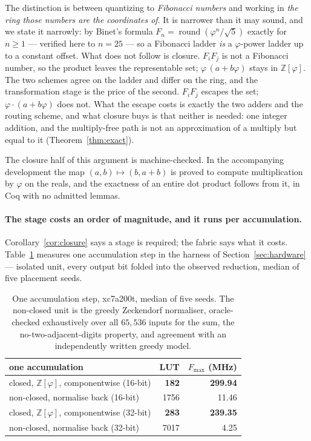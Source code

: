 The distinction is between quantizing to \emph{Fibonacci numbers} and working in
\emph{the ring those numbers are the coordinates of}. It is narrower than it may
sound, and we state it narrowly: by Binet's formula $F_n = \operatorname{round}
(\varphi^{n}/\sqrt5)$ exactly for $n \ge 1$ --- verified here to $n = 25$ --- so a
Fibonacci ladder \emph{is} a $\varphi$-power ladder up to a constant offset. What
does not follow is closure. $F_iF_j$ is not a Fibonacci number, so the product
leaves the representable set; $\varphi\,(a+b\varphi)$ stays in
$\mathbb{Z}[\varphi]$. The two schemes agree on the ladder and differ on the
ring, and the transformation stage is the price of the second. $F_iF_j$ escapes the set;
$\varphi\cdot(a+b\varphi)$ does not. What the escape costs is exactly the two
adders and the routing scheme, and what closure buys is that neither is needed:
one integer addition, and the multiply-free path is not an approximation of a
multiply but equal to it (Theorem~\ref{thm:exact}).

The closure half of this argument is machine-checked. In the accompanying
development the map $(a,b)\mapsto(b,a+b)$ is proved to compute multiplication by
$\varphi$ on the reals, and the exactness of an entire dot product follows from
it, in Coq with no admitted lemmas.

\paragraph{The stage costs an order of magnitude, and it runs per accumulation.}
Corollary~\ref{cor:closure} says a stage is required; the fabric says what it
costs. Table~\ref{tab:closure} measures one accumulation step in the harness of
Section~\ref{sec:hardware} --- isolated unit, every output bit folded into the
observed reduction, median of five placement seeds.

\begin{table}[t]\centering
\caption{One accumulation step, xc7a200t, median of five seeds. The non-closed
unit is the greedy Zeckendorf normaliser, oracle-checked exhaustively over all
$65{,}536$ inputs for the sum, the no-two-adjacent-digits property, and
agreement with an independently written greedy model.}
\label{tab:closure}
\begin{tabular}{lrr}
\toprule
one accumulation & LUT & $F_{\max}$ (MHz) \\
\midrule
closed, $\mathbb{Z}[\varphi]$, componentwise (16-bit) & \textbf{182} & \textbf{299.94} \\
non-closed, normalise back (16-bit)                   & 1756 & 11.46 \\
\addlinespace
closed, $\mathbb{Z}[\varphi]$, componentwise (32-bit) & \textbf{283} & \textbf{239.35} \\
non-closed, normalise back (32-bit)                   & 7017 & 4.25 \\
\bottomrule
\end{tabular}
\end{table}

